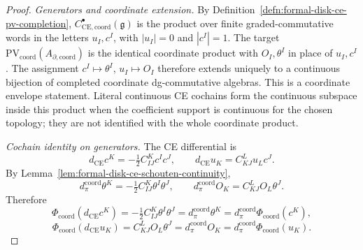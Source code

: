 \documentclass[11pt]{memoir}
\begin{document}
\begin{proof}
  \emph{Generators and coordinate extension.}
  By Definition~\ref{defn:formal-disk-ce-pv-completion},
  \(C^\bullet_{\mathrm{CE},\mathrm{coord}}(\mathfrak g)\) is the product
  over finite graded-commutative words in the letters \(u_I,c^I\), with
  \(|u_I|=0\) and \(|c^I|=1\).  The target
  \(\mathrm{PV}_{\mathrm{coord}}(A_{\partial,\mathrm{coord}})\) is the
  identical coordinate product with \(O_I,\theta^I\) in place of
  \(u_I,c^I\).  The assignment \(c^I\mapsto\theta^I\),
  \(u_I\mapsto O_I\) therefore extends uniquely to a continuous bijection
  of completed coordinate dg-commutative algebras.  This is a coordinate
  envelope statement.  Literal continuous CE cochains form the continuous
  subspace inside this product when the coefficient support is continuous
  for the chosen topology; they are not identified with the whole
  coordinate product.

  \emph{Cochain identity on generators.} The CE differential is
  $$d_{\mathrm{CE}}c^K=-\tfrac12 C^K_{IJ}c^Ic^J,\qquad
    d_{\mathrm{CE}}u_K=C^L_{KJ}u_L c^J.$$
  By Lemma~\ref{lem:formal-disk-ce-schouten-continuity},
  $$d_\pi^{\mathrm{coord}}\theta^K=-\tfrac12 C^K_{IJ}\theta^I\theta^J,\qquad
    d_\pi^{\mathrm{coord}} O_K=C^L_{KJ}O_L\theta^J.$$
  Therefore
	  $$\Phi_{\mathrm{coord}}(d_{\mathrm{CE}}c^K)
	    =-\tfrac12 C^K_{IJ}\theta^I\theta^J
		    =d_\pi^{\mathrm{coord}}\theta^K=d_\pi^{\mathrm{coord}}\Phi_{\mathrm{coord}}(c^K),$$
		  $$\Phi_{\mathrm{coord}}(d_{\mathrm{CE}}u_K)
		    =C^L_{KJ}O_L\theta^J=d_\pi^{\mathrm{coord}} O_K
		    =d_\pi^{\mathrm{coord}}\Phi_{\mathrm{coord}}(u_K).$$


\end{proof}
\end{document}
